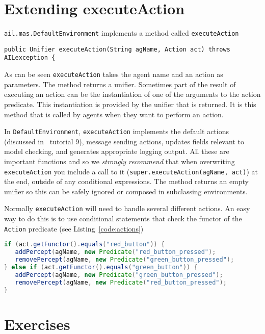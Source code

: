 \documentclass[a4]{article}
\begin{document}
\section{Extending executeAction}
\texttt{ail.mas.DefaultEnvironment} implements a method called \texttt{executeAction}

\begin{verbatim}
public Unifier executeAction(String agName, Action act) throws AILexception {
\end{verbatim}

As can be seen \texttt{executeAction} takes the agent name and an action as parameters.  The method returns a unifier.  Sometimes part of the result of executing an action can be the instantiation of one of the arguments to the action predicate.  This instantiation is provided by the unifier that is returned.  It is this method that is called by agents when they want to perform an action.

In \texttt{DefaultEnvironment}, \texttt{executeAction} implements the default actions (discussed in \gwendolen\ tutorial 9), message sending actions, updates fields relevant to model checking, and generates appropriate logging output.   All these are important functions and so we \emph{strongly recommend} that when overwriting \texttt{executeAction} you include a call to it (\texttt{super.executeAction(agName, act)}) at the end, outside of any conditional expressions.  The method returns an empty unifier so this can be safely ignored or composed in subclassing environments.

Normally \texttt{executeAction} will need to handle several different actions.  An easy way to do this is to use conditional statements that check the functor of the \texttt{Action} predicate (see Listing~\ref{code:actions})

\begin{lstlisting}[float,caption=Sample Action Handling Code,basicstyle=\sffamily,language=Java,style=easslisting,label=code:actions]
if (act.getFunctor().equals("red_button")) {
   addPercept(agName, new Predicate("red_button_pressed");
   removePercept(agName, new Predicate("green_button_pressed");
} else if (act.getFunctor().equals("green_button")) {
   addPercept(agName, new Predicate("green_button_pressed");
   removePercept(agName, new Predicate("red_button_pressed");
}
\end{lstlisting}

\section{Exercises}
\end{document}
